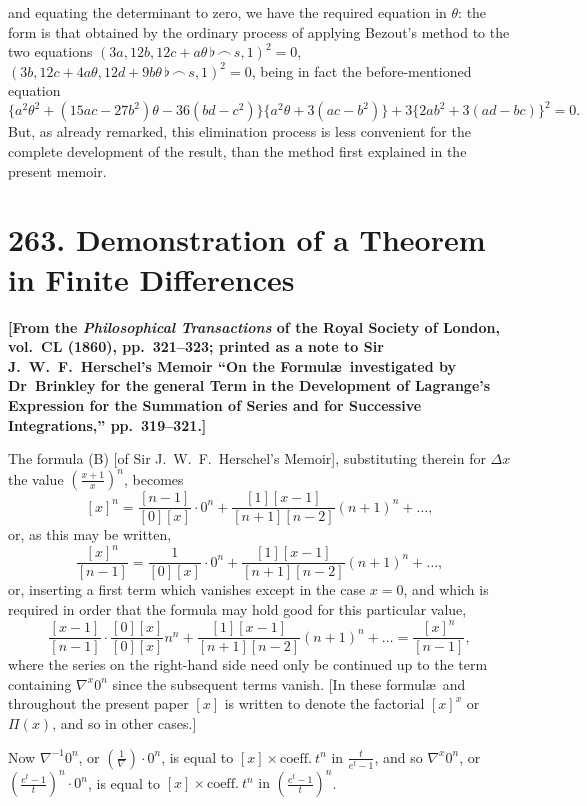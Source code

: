 \documentclass[11pt,a4paper]{book}
\begin{document}
and equating the determinant to zero, we have the required equation in $\theta$: the form is that obtained by the ordinary process of applying Bezout's method to the two equations $(3a,12b,12c+a\theta\,\flat\,\frown\, s,1)^2=0$, $(3b,12c+4a\theta,12d+9b\theta\,\flat\,\frown\, s,1)^2=0$, being in fact the before-mentioned equation
\[
\{a^2\theta^2+(15ac-27b^2)\theta-36(bd-c^2)\}\{a^2\theta+3(ac-b^2)\}+3\{2ab^2+3(ad-bc)\}^2=0.
\]
But, as already remarked, this elimination process is less convenient for the complete development of the result, than the method first explained in the present memoir.

\newpage
\section[263. Demonstration of a Theorem in Finite Differences]{263. Demonstration of a Theorem in Finite Differences}

\textbf{[From the \textit{Philosophical Transactions} of the Royal Society of London, vol.~CL (1860), pp.~321--323; printed as a note to Sir J.~W.~F.~Herschel's Memoir ``On the Formul\ae\ investigated by Dr~Brinkley for the general Term in the Development of Lagrange's Expression for the Summation of Series and for Successive Integrations,'' pp.~319--321.]}

The formula (B) [of Sir J.~W.~F.~Herschel's Memoir], substituting therein for $\Delta x$ the value $(\frac{x+1}{x})^n$, becomes
\[
[x]^n=\frac{[n-1]}{[0][x]}\cdot0^n+\frac{[1][x-1]}{[n+1][n-2]}(n+1)^n+\ldots,
\]
or, as this may be written,
\[
\frac{[x]^n}{[n-1]}=\frac{1}{[0][x]}\cdot0^n+\frac{[1][x-1]}{[n+1][n-2]}(n+1)^n+\ldots,
\]
or, inserting a first term which vanishes except in the case $x=0$, and which is required in order that the formula may hold good for this particular value,
\[
\frac{[x-1]}{[n-1]}\cdot\frac{[0][x]}{[0][x]}n^n+\frac{[1][x-1]}{[n+1][n-2]}(n+1)^n+\ldots=\frac{[x]^n}{[n-1]},
\]
where the series on the right-hand side need only be continued up to the term containing $\nabla^x0^n$ since the subsequent terms vanish. [In these formul\ae\ and throughout the present paper $[x]$ is written to denote the factorial $[x]^x$ or $\Pi(x)$, and so in other cases.]

Now $\nabla^{-1}0^n$, or $\left(\frac{1}{\nabla}\right)\cdot0^n$, is equal to $[x]\times\text{coeff.}\ t^n\text{ in }\frac{t}{e^t-1}$, and so $\nabla^x0^n$, or $\left(\frac{e^t-1}{t}\right)^n\cdot0^n$, is equal to $[x]\times\text{coeff.}\ t^n\text{ in }\left(\frac{e^t-1}{t}\right)^n$.
\end{document}
